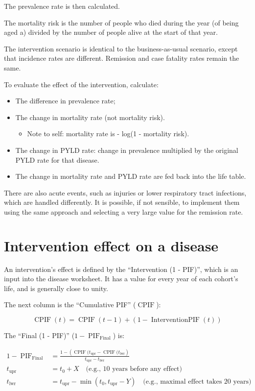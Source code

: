 \documentclass[12pt]{scrartcl}
\DeclareMathOperator{\PIF}{PIF}
\DeclareMathOperator{\CPIF}{CPIF}
\DeclareMathOperator{\IPIF}{InterventionPIF}
\newcommand{\FPIF}{\ensuremath{1 - \PIF_{\mathrm{Final}}}}
\begin{document}
The prevalence rate is then calculated.

The mortality risk is the number of people who died during the year (of being aged a) divided by the number of people alive at the start of that year.

The intervention scenario is identical to the business-as-usual scenario, except that incidence rates are different. Remission and case fatality rates remain the same.

To evaluate the effect of the intervention, calculate:

\begin{itemize}
\item The difference in prevalence rate;
\item The change in mortality rate (not mortality risk).
  \begin{itemize}
  \item Note to self: mortality rate is - log(1 - mortality risk).
  \end{itemize}
\item The change in PYLD rate: change in prevalence multiplied by the original PYLD rate for that disease.
\item The change in mortality rate and PYLD rate are fed back into the life table.
\end{itemize}

There are also acute events, such as injuries or lower respiratory tract infections, which are handled differently. It is possible, if not sensible, to implement them using the same approach and selecting a very large value for the remission rate.

\section*{Intervention effect on a disease}

An intervention's effect is defined by the ``Intervention (1 - PIF)'', which is an input into the disease worksheet. It has a value for every year of each cohort's life, and is generally close to unity.

The next column is the ``Cumulative PIF'' (\(\CPIF\)):

\begin{equation*}
  \CPIF(t) = \CPIF(t-1) + (1 - \IPIF(t))
\end{equation*}

The ``Final (1 - PIF)'' (\(\FPIF\)) is:

\begin{align*}
  \FPIF &= \frac{1 - \left(\CPIF(t_\mathrm{upr} - \CPIF(t_\mathrm{lwr}\right)%
  }{t_\mathrm{upr} - t_\mathrm{lwr}} \\
  t_\mathrm{upr} &= t_0 + X \quad \text{(e.g., 10 years before any effect)} \\
  t_\mathrm{lwr} &= t_\mathrm{upr} - \min(t_0, t_\mathrm{upr} - Y)%
  \quad \text{(e.g., maximal effect takes 20 years)} \\
\end{align*}
\end{document}
